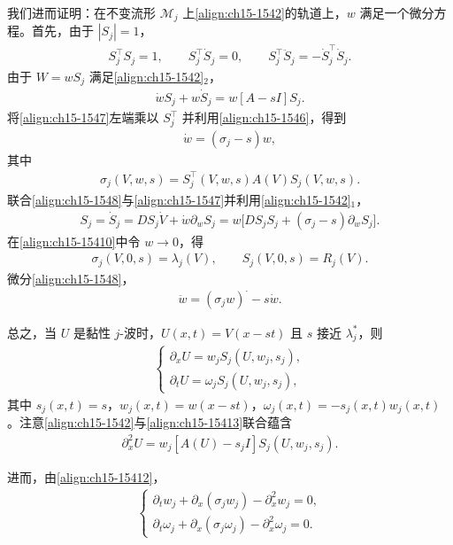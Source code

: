 \documentclass[../../main.tex]{subfiles}
\begin{document}
我们进而证明：在不变流形 $\mathscr{M}_j$ 上\eqref{align:ch15-1542}的轨道上，$w$ 满足一个微分方程。首先，由于 $|S_j|=1$，
\begin{align}
S_j^\top S_j=1,\qquad S_j^\top\dot S_j=0,\qquad S_j^\top\ddot S_j=-\dot S_j^\top\dot S_j.
\label{align:ch15-1546}
\end{align}
由于 $W=wS_j$ 满足\eqref{align:ch15-1542}$_2$，
\begin{align}
\dot wS_j+w\dot S_j=w[A-sI]S_j.
\label{align:ch15-1547}
\end{align}
将\eqref{align:ch15-1547}左端乘以 $S_j^\top$ 并利用\eqref{align:ch15-1546}，得到
\begin{align}
\dot w=(\sigma_j-s)w,
\label{align:ch15-1548}
\end{align}
其中
\begin{align}
\sigma_j(V,w,s)=S_j^\top(V,w,s)A(V)S_j(V,w,s).
\label{align:ch15-1549}
\end{align}
联合\eqref{align:ch15-1548}与\eqref{align:ch15-1547}并利用\eqref{align:ch15-1542}$_1$，
\begin{align}
[A-\sigma_jI]S_j=\dot S_j=DS_j\dot V+\dot w\partial_wS_j=w\bigl[DS_jS_j+(\sigma_j-s)\partial_wS_j\bigr].
\label{align:ch15-15410}
\end{align}
在\eqref{align:ch15-15410}中令 $w\to0$，得
\begin{align}
\sigma_j(V,0,s)=\lambda_j(V),\qquad S_j(V,0,s)=R_j(V).
\label{align:ch15-15411}
\end{align}
微分\eqref{align:ch15-1548}，
\begin{align}
\ddot w=(\sigma_jw)^\cdot-s\dot w.
\label{align:ch15-15412}
\end{align}

总之，当 $U$ 是黏性 $j$-波时，$U(x,t)=V(x-st)$ 且 $s$ 接近 $\lambda_j^*$，则
\begin{align}
\begin{cases}
\partial_xU=w_jS_j(U,w_j,s_j),\\
\partial_tU=\omega_jS_j(U,w_j,s_j),
\end{cases}
\label{align:ch15-15413}
\end{align}
其中 $s_j(x,t)=s$，$w_j(x,t)=w(x-st)$，$\omega_j(x,t)=-s_j(x,t)w_j(x,t)$。注意\eqref{align:ch15-1542}与\eqref{align:ch15-15413}联合蕴含
\begin{align}
\partial_x^2U=w_j[A(U)-s_jI]S_j(U,w_j,s_j).
\label{align:ch15-15414}
\end{align}

进而，由\eqref{align:ch15-15412}，
\begin{align}
\begin{cases}
\partial_tw_j+\partial_x(\sigma_jw_j)-\partial_x^2w_j=0,\\
\partial_t\omega_j+\partial_x(\sigma_j\omega_j)-\partial_x^2\omega_j=0.
\end{cases}
\label{align:ch15-15415}
\end{align}
\end{document}
